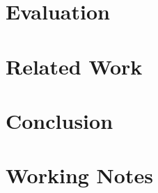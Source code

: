 \documentclass[12pt,oneside,letterpaper]{report}
\begin{document}
\chapter{Evaluation} \label{ch:evaluation} \label{sec:results}


\chapter{Related Work} \label{ch:related_work}


\chapter{Conclusion} \label{ch:conclusion}


\appendix
\chapter{Working Notes} \label{ch:working_notes}



\cleardoublepage
{}
{}

\printbibliography
\end{document}
